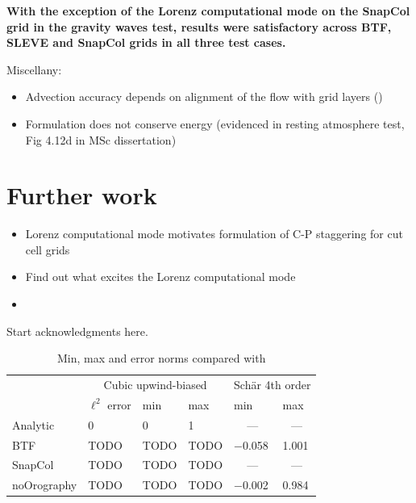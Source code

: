 \documentclass{ametsoc}
\begin{document}
\textbf{With the exception of the Lorenz computational mode on the SnapCol grid in the gravity waves test, results were satisfactory across BTF, SLEVE and SnapCol grids in all three test cases.}

Miscellany:
\begin{itemize}
	\item Advection accuracy depends on alignment of the flow with grid layers ()
	\item Formulation does not conserve energy (evidenced in resting atmosphere test, Fig 4.12d in MSc dissertation)
\end{itemize}

\section{Further work}
\begin{itemize}
	\item Lorenz computational mode motivates formulation of C-P staggering for cut cell grids
	\item Find out what excites the Lorenz computational mode
	\item {}
\end{itemize}

\acknowledgments
Start acknowledgments here.






\begin{table}[t]
\caption{Min, max and error norms compared with \textcite{schaer2002}}
\label{tab:advection}
%
\begin{center}
\begin{tabular}{ l l l l l l }
\hline\hline
& \multicolumn{3}{c}{Cubic upwind-biased} & \multicolumn{2}{c}{Sch\"ar 4th order} \\
& $\ell^2$ error & min & max & min & max \\
\hline
Analytic  & 0 & 0 & 1 & \multicolumn{1}{c}{---} & \multicolumn{1}{c}{---} \\
BTF 	  & TODO & TODO & TODO & \num{-0.058} & \num{1.001} \\
SnapCol   & TODO & TODO & TODO & \multicolumn{1}{c}{---} & \multicolumn{1}{c}{---} \\
noOrography & TODO & TODO & TODO & \num{-0.002} & \num{0.984} \\
\hline
\end{tabular}
\end{center}
\end{table}

\end{document}
